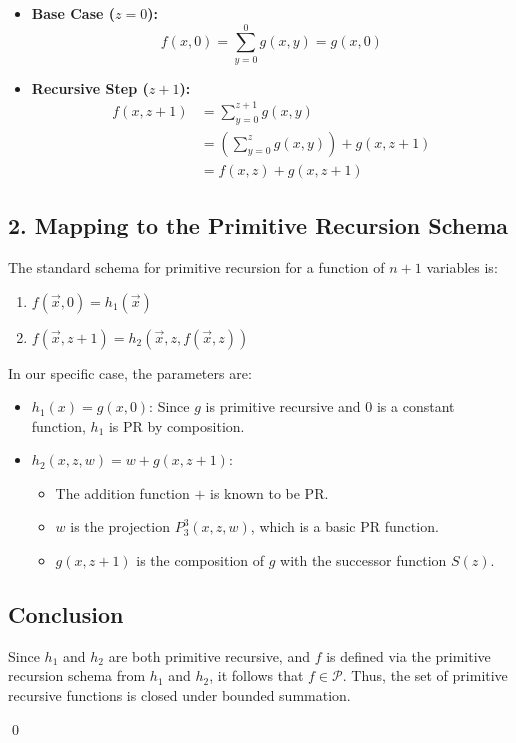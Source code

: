 \documentclass{article}
\begin{document}
\begin{itemize}
    \item \textbf{Base Case ($z=0$):}
    \[
    f(x, 0) = \sum_{y=0}^{0} g(x, y) = g(x, 0)
    \]
    
    \item \textbf{Recursive Step ($z+1$):}
    \begin{align*}
    f(x, z+1) &= \sum_{y=0}^{z+1} g(x, y) \\
    &= \left( \sum_{y=0}^{z} g(x, y) \right) + g(x, z+1) \\
    &= f(x, z) + g(x, z+1)
    \end{align*}
\end{itemize}

\subsection*{2. Mapping to the Primitive Recursion Schema}
The standard schema for primitive recursion for a function of $n+1$ variables is:
\begin{enumerate}
    \item $f(\vec{x}, 0) = h_1(\vec{x})$
    \item $f(\vec{x}, z+1) = h_2(\vec{x}, z, f(\vec{x}, z))$
\end{enumerate}

In our specific case, the parameters are:
\begin{itemize}
    \item \textbf{$h_1(x) = g(x, 0)$}: Since $g$ is primitive recursive and $0$ is a constant function, $h_1$ is PR by composition.
    \item \textbf{$h_2(x, z, w) = w + g(x, z+1)$}:
    \begin{itemize}
        \item The addition function $+$ is known to be PR.
        \item $w$ is the projection $P_3^3(x, z, w)$, which is a basic PR function.
        \item $g(x, z+1)$ is the composition of $g$ with the successor function $S(z)$.
    \end{itemize}
\end{itemize}

\subsection*{Conclusion}
Since $h_1$ and $h_2$ are both primitive recursive, and $f$ is defined via the primitive recursion schema from $h_1$ and $h_2$, it follows that $f \in \mathcal{P}$. Thus, the set of primitive recursive functions is closed under bounded summation.

\qed
\end{document}
